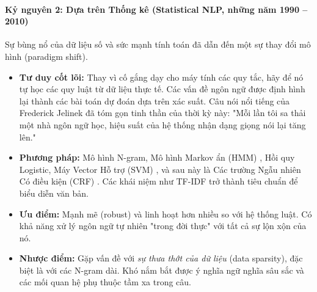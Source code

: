 \paragraph{Kỷ nguyên 2: Dựa trên Thống kê (Statistical NLP, những năm 1990 -- 2010)}
Sự bùng nổ của dữ liệu số và sức mạnh tính toán đã dẫn đến một sự thay đổi mô hình (paradigm shift).
\begin{itemize}
    \item \textbf{Tư duy cốt lõi:} Thay vì cố gắng dạy cho máy tính các quy tắc, hãy để nó tự học các quy luật từ dữ liệu thực tế. Các vấn đề ngôn ngữ được định hình lại thành các bài toán dự đoán dựa trên xác suất. Câu nói nổi tiếng của Frederick Jelinek đã tóm gọn tinh thần của thời kỳ này: "Mỗi lần tôi sa thải một nhà ngôn ngữ học, hiệu suất của hệ thống nhận dạng giọng nói lại tăng lên."
    \item \textbf{Phương pháp:} Mô hình N-gram, Mô hình Markov ẩn (HMM) \cite{rabiner1989tutorial}, Hồi quy Logistic, Máy Vector Hỗ trợ (SVM) \cite{cortes1995support}, và sau này là Các trường Ngẫu nhiên Có điều kiện (CRF) \cite{lafferty2001conditional}. Các khái niệm như TF-IDF trở thành tiêu chuẩn để biểu diễn văn bản.
    \item \textbf{Ưu điểm:} Mạnh mẽ (robust) và linh hoạt hơn nhiều so với hệ thống luật. Có khả năng xử lý ngôn ngữ tự nhiên "trong đời thực" với tất cả sự lộn xộn của nó.
    \item \textbf{Nhược điểm:} Gặp vấn đề với \textit{sự thưa thớt của dữ liệu} (data sparsity), đặc biệt là với các N-gram dài. Khó nắm bắt được ý nghĩa ngữ nghĩa sâu sắc và các mối quan hệ phụ thuộc tầm xa trong câu.
\end{itemize}


